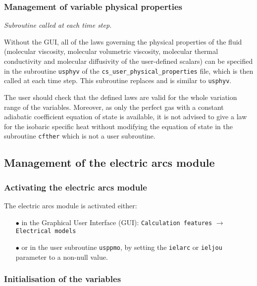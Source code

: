 {{{\subsubsection{Management of variable physical properties}

\noindent
\textit{Subroutine called at each time step.}

Without the GUI, all of the laws governing the physical properties of the fluid
(molecular viscosity, molecular volumetric viscosity, molecular thermal conductivity and
molecular diffusivity of the user-defined scalars) can be specified in the subroutine \texttt{usphyv} of
the \texttt{cs\_user\_physical\_properties} file,
which is then called at each time step. This subroutine replaces and is similar to \texttt{usphyv}.

The user should check that the defined laws are valid for
the whole variation range of the variables. Moreover, as only the perfect gas with a constant
adiabatic coefficient equation of state is available, it is not advised to give a law for the isobaric
specific heat without modifying the equation of state in the subroutine \texttt{cfther} which is not
a user subroutine.

\subsection{Management of the electric arcs module}

\subsubsection{Activating the electric arcs module}\label{sec:acti-lag}

The electric arcs module is activated either:
%
\begin{itemize}
 \item [$\bullet$] in the Graphical User Interface (GUI): \texttt{Calculation features} $\rightarrow$ \texttt{Electrical models}
 \item [$\bullet$] or in the user subroutine \texttt{usppmo}, by setting the \texttt{ielarc} or \texttt{ieljou} parameter to a non-null value.
\end{itemize}

\subsubsection{Initialisation of the variables}

}}}
